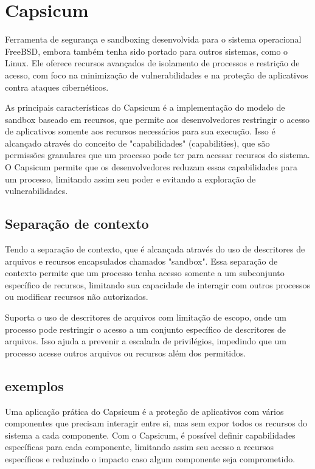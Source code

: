 \section{Capsicum}

Ferramenta de segurança e sandboxing desenvolvida para o sistema operacional FreeBSD, embora também tenha sido portado para outros sistemas, como o Linux. Ele oferece recursos avançados de isolamento de processos e restrição de acesso, com foco na minimização de vulnerabilidades e na proteção de aplicativos contra ataques cibernéticos.

As principais características do Capsicum é a implementação do modelo de sandbox baseado em recursos, que permite aos desenvolvedores restringir o acesso de aplicativos somente aos recursos necessários para sua execução. Isso é alcançado através do conceito de "capabilidades" (capabilities), que são permissões granulares que um processo pode ter para acessar recursos do sistema. O Capsicum permite que os desenvolvedores reduzam essas capabilidades para um processo, limitando assim seu poder e evitando a exploração de vulnerabilidades.

\subsection{Separação de contexto}

Tendo a separação de contexto, que é alcançada através do uso de descritores de arquivos e recursos encapsulados chamados "sandbox". Essa separação de contexto permite que um processo tenha acesso somente a um subconjunto específico de recursos, limitando sua capacidade de interagir com outros processos ou modificar recursos não autorizados.

Suporta o uso de descritores de arquivos com limitação de escopo, onde um processo pode restringir o acesso a um conjunto específico de descritores de arquivos. Isso ajuda a prevenir a escalada de privilégios, impedindo que um processo acesse outros arquivos ou recursos além dos permitidos.

\subsection{exemplos}

Uma aplicação prática do Capsicum é a proteção de aplicativos com vários componentes que precisam interagir entre si, mas sem expor todos os recursos do sistema a cada componente. Com o Capsicum, é possível definir capabilidades específicas para cada componente, limitando assim seu acesso a recursos específicos e reduzindo o impacto caso algum componente seja comprometido.